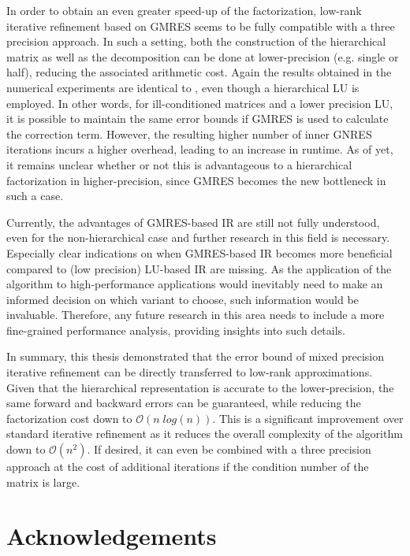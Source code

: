 In order to obtain an even greater speed-up of the factorization, low-rank iterative refinement based on GMRES seems to be fully compatible with a three precision approach. In such a setting, both the construction of the hierarchical matrix as well as the decomposition can be done at lower-precision (e.g. single or half), reducing the associated arithmetic cost. Again the results obtained in the numerical experiments are identical to \cite{carson_accelerating_2018}, even though a hierarchical LU is employed. In other words, for ill-conditioned matrices and a lower precision LU, it is possible to maintain the same error bounds if GMRES is used to calculate the correction term. However, the resulting higher number of inner GNRES iterations incurs a higher overhead, leading to an increase in runtime. As of yet, it remains unclear whether or not this is advantageous to a hierarchical factorization in higher-precision, since GMRES becomes the new bottleneck in such a case.

Currently, the advantages of GMRES-based IR are still not fully understood, even for the  non-hierarchical case and further research in this field is necessary. Especially clear indications on when GMRES-based IR becomes more beneficial compared to (low precision) LU-based IR are missing. As the application of the algorithm to high-performance applications would inevitably need to make an informed decision on which variant to choose, such information would be invaluable. Therefore, any future research in this area needs to include a more fine-grained performance analysis, providing insights into such details.

In summary, this thesis demonstrated that the error bound of mixed precision iterative refinement can be directly transferred to low-rank approximations. Given that the hierarchical representation is accurate to the lower-precision, the same forward and backward errors can be guaranteed, while reducing the factorization cost down to $\mathcal{O}(n\;log(n))$. This is a significant improvement over standard iterative refinement as it reduces the overall complexity of the algorithm down to $\mathcal{O}(n^2)$. If desired, it can even be combined with a three precision approach at the cost of additional iterations if the condition number of the matrix is large.


\chapter{Acknowledgements}
\label{chap:acknowledgements}

